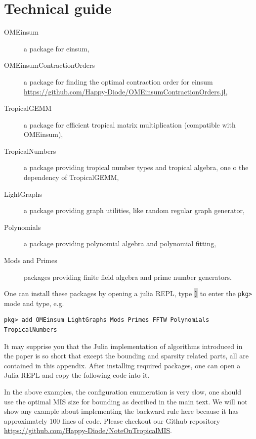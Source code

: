 \documentclass[review,onefignum,onetabnum]{siamart190516}
\newcommand{\<}{\langle}
\renewcommand{\>}{\rangle}
\newcounter{example}
\begin{document}
\section{Technical guide}\label{sec:technical}
\begin{description}
	\item[OMEinsum] a package for einsum,
	\item[OMEinsumContractionOrders] a package for finding the optimal contraction order for einsum \\ \href{https://github.com/Happy-Diode/OMEinsumContractionOrders.jl}{https://github.com/Happy-Diode/OMEinsumContractionOrders.jl},
	\item[TropicalGEMM] a package for efficient tropical matrix multiplication (compatible with OMEinsum),
	\item[TropicalNumbers] a package providing tropical number types and tropical algebra, one o the dependency of TropicalGEMM,
	\item[LightGraphs] a package providing graph utilities, like random regular graph generator,
	\item[Polynomials] a package providing polynomial algebra and polynomial fitting,
	\item[Mods and Primes] packages providing finite field algebra and prime number generators.
\end{description}

One can install these packages by opening a julia REPL, type \colorbox{lightgray}{\texttt{]}} to enter the \texttt{pkg>} mode and type, e.g.
\begin{lstlisting}
pkg> add OMEinsum LightGraphs Mods Primes FFTW Polynomials TropicalNumbers
\end{lstlisting}

It may supprise you that the Julia implementation of algorithms introduced in the paper is so short that except the bounding and sparsity related parts,
all are contained in this appendix. After installing required packages, one can open a Julia REPL and copy the following code into it.



In the above examples, the configuration enumeration is very slow, one should use the optimal MIS size for bounding as decribed in the main text.
We will not show any example about implementing the backward rule here because it has approximately 100 lines of code.
Please checkout our Github repository \href{https://github.com/Happy-Diode/NoteOnTropicalMIS}{https://github.com/Happy-Diode/NoteOnTropicalMIS}.
\end{document}
